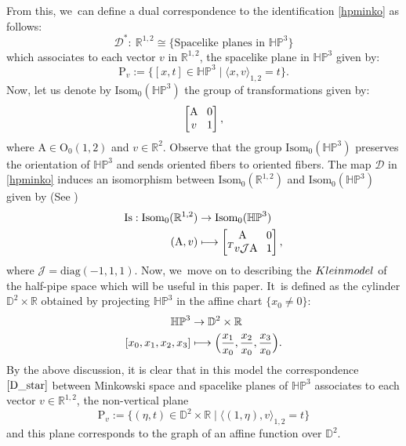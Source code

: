 \documentclass[11pt]{article}
\newcommand\mto{\mathchoice{\longmapsto}{\mapsto}{\mapsto}{\mapsto}}
\theoremstyle{plain}
\theoremstyle{definition}
\newcommand{\minko}{\mathbb{R}^{1,2}}
\newcommand{\HP}{\mathbb{HP}^3}
\newcommand{\isom}{\mathrm{Isom}_0}
\newcommand{\inner}[1] {\langle #1 \rangle}
\begin{document}
From this, we~can define a dual correspondence to the identification \eqref{hpminko} as follows:
\begin{equation}\label{D_star}
\mathcal{D}^*: \ \minko\cong\{\text{Spacelike planes in } \HP \}
\end{equation}
which associates to each vector $v$ in $\minko$, the spacelike plane in $\HP$ given by:
\[
\mathrm{P}_v:=\{[x,t]\in\HP \mid \inner{x,v}_{1,2}=t \}.
\]
Now, let us denote by $\isom(\HP)$ the group of transformations given by:
\[\arraycolsep4pt
\begin{bmatrix}
\mathrm{A} & 0 \\
v & 1
\end{bmatrix},
\]
where $\mathrm{A}\in \mathrm{O}_{0}(1,2)$ and $v\in \mathbb{R}^2$. Observe that the group $\isom(\HP)$ preserves the orientation of $\HP$ and sends oriented fibers to oriented fibers. The map $\mathcal{D}$ in \eqref{hpminko} induces an isomorphism between
$\isom(\mathbb{R}^{1,2})$ and $\isom(\HP)$ given by (See \cite[\S 2.8]{riolo_seppi})
\begin{equation}\label{groupeduality}
\begin{aligned}
\mathrm{Is}:\isom(\mathbb{R}^{1,2}) & \to \isom(\HP) \\
(\mathrm{A},v) & \mto\arraycolsep4pt \begin{bmatrix}
\mathrm{A} & 0 \\
^T v\mathcal{J}\mathrm{A} & 1
\end{bmatrix},
\end{aligned}
\end{equation}
where $\mathcal{J}=\mathrm{diag}(-1,1,1)$.
Now, we~move on to describing the $\emph{Klein model}$ of the half-pipe space which will be useful in this paper. It~is defined as the cylinder $\mathbb{D}^2\times\mathbb{R}$ obtained by projecting $\HP$ in the affine chart $\{x_0\neq 0\}$:
\begin{equation}\label{7}
\begin{aligned}
\HP & \to \mathbb{D}^2\times\mathbb{R} \\
[x_0,x_1,x_2,x_3] & \mto \Bigl(\frac{x_1}{x_0},\frac{x_2}{x_0},\frac{x_3}{x_0}\Bigr).
\end{aligned}
\end{equation}
By the above discussion, it is clear that in this model the correspondence $\eqref{D_star}$ between Minkowski space and spacelike planes of $\HP$ associates to each vector $v\in\minko$, the non-vertical plane
\begin{equation}\label{formule_dual_plan}
\mathrm{P}_v:=\{(\eta,t)\in\mathbb{D}^2\times\mathbb{R} \mid \langle (1,\eta),v \rangle_{1,2}=t \}\end{equation} and this plane corresponds to the graph of an affine function over $\mathbb{D}^2$.
\end{document}
